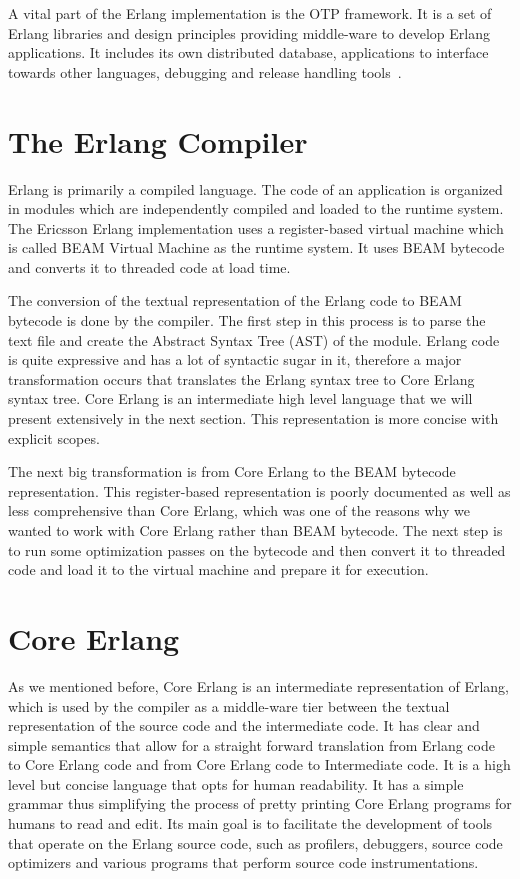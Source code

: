 A vital part of the Erlang implementation is the OTP framework. It is a set of
Erlang libraries and design principles providing middle-ware to develop Erlang
applications. It includes its own distributed database, applications to
interface towards other languages, debugging and release handling tools~\cite{erlang_site}.


\section{The Erlang Compiler}\label{sec:erlang_compiler}

Erlang is primarily a compiled language. The code of an application is
organized in modules which are independently compiled and loaded to the runtime
system. The Ericsson Erlang implementation uses a register-based virtual
machine which is called BEAM Virtual Machine as the runtime system. It uses
BEAM bytecode and converts it to threaded code at load time.

The conversion of the textual representation of the Erlang code to BEAM
bytecode is done by the compiler. The first step in this process is to parse
the text file and create the Abstract Syntax Tree (AST) of the module. Erlang
code is quite expressive and has a lot of syntactic sugar in it, therefore a
major transformation occurs that translates the Erlang syntax tree to Core
Erlang syntax tree. Core Erlang is an intermediate high level language that we
will present extensively in the next section. This representation is more
concise with explicit scopes.

The next big transformation is from Core Erlang to the BEAM bytecode
representation. This register-based representation is poorly documented as well
as less comprehensive than Core Erlang, which was one of the reasons why we
wanted to work with Core Erlang rather than BEAM bytecode. The next step is to
run some optimization passes on the bytecode and then convert it to threaded
code and load it to the virtual machine and prepare it for execution.


\section{Core Erlang}\label{sec:core_erlang}

As we mentioned before, Core Erlang is an intermediate representation of
Erlang, which is used by the compiler as a middle-ware tier between the textual
representation of the source code and the intermediate code. It has clear and
simple semantics that allow for a straight forward translation from Erlang code
to Core Erlang code and from Core Erlang code to Intermediate code. It is a
high level but concise language that opts for human readability. It has a
simple grammar thus simplifying the process of pretty printing Core Erlang
programs for humans to read and edit. Its main goal is to facilitate the
development of tools that operate on the Erlang source code, such as profilers,
debuggers, source code optimizers and various programs that perform source code
instrumentations.

